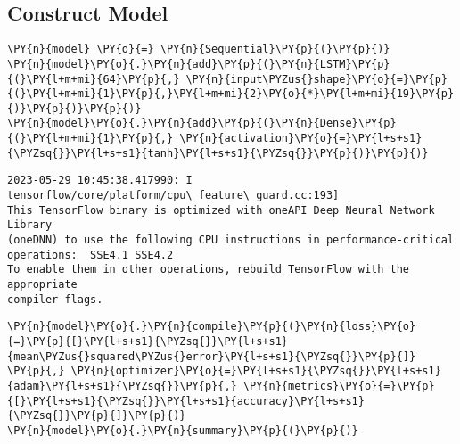     \hypertarget{construct-model}{%
\subsection{Construct Model}\label{construct-model}}

    \begin{tcolorbox}[breakable, size=fbox, boxrule=1pt, pad at break*=1mm,colback=cellbackground, colframe=cellborder]
\begin{Verbatim}[commandchars=\\\{\}]
\PY{n}{model} \PY{o}{=} \PY{n}{Sequential}\PY{p}{(}\PY{p}{)}
\PY{n}{model}\PY{o}{.}\PY{n}{add}\PY{p}{(}\PY{n}{LSTM}\PY{p}{(}\PY{l+m+mi}{64}\PY{p}{,} \PY{n}{input\PYZus{}shape}\PY{o}{=}\PY{p}{(}\PY{l+m+mi}{1}\PY{p}{,}\PY{l+m+mi}{2}\PY{o}{*}\PY{l+m+mi}{19}\PY{p}{)}\PY{p}{)}\PY{p}{)}
\PY{n}{model}\PY{o}{.}\PY{n}{add}\PY{p}{(}\PY{n}{Dense}\PY{p}{(}\PY{l+m+mi}{1}\PY{p}{,} \PY{n}{activation}\PY{o}{=}\PY{l+s+s1}{\PYZsq{}}\PY{l+s+s1}{tanh}\PY{l+s+s1}{\PYZsq{}}\PY{p}{)}\PY{p}{)}
\end{Verbatim}
\end{tcolorbox}

    \begin{Verbatim}[commandchars=\\\{\}]
2023-05-29 10:45:38.417990: I tensorflow/core/platform/cpu\_feature\_guard.cc:193]
This TensorFlow binary is optimized with oneAPI Deep Neural Network Library
(oneDNN) to use the following CPU instructions in performance-critical
operations:  SSE4.1 SSE4.2
To enable them in other operations, rebuild TensorFlow with the appropriate
compiler flags.
    \end{Verbatim}

    \begin{tcolorbox}[breakable, size=fbox, boxrule=1pt, pad at break*=1mm,colback=cellbackground, colframe=cellborder]
\begin{Verbatim}[commandchars=\\\{\}]
\PY{n}{model}\PY{o}{.}\PY{n}{compile}\PY{p}{(}\PY{n}{loss}\PY{o}{=}\PY{p}{[}\PY{l+s+s1}{\PYZsq{}}\PY{l+s+s1}{mean\PYZus{}squared\PYZus{}error}\PY{l+s+s1}{\PYZsq{}}\PY{p}{]} \PY{p}{,} \PY{n}{optimizer}\PY{o}{=}\PY{l+s+s1}{\PYZsq{}}\PY{l+s+s1}{adam}\PY{l+s+s1}{\PYZsq{}}\PY{p}{,} \PY{n}{metrics}\PY{o}{=}\PY{p}{[}\PY{l+s+s1}{\PYZsq{}}\PY{l+s+s1}{accuracy}\PY{l+s+s1}{\PYZsq{}}\PY{p}{]}\PY{p}{)}
\PY{n}{model}\PY{o}{.}\PY{n}{summary}\PY{p}{(}\PY{p}{)}
\end{Verbatim}
\end{tcolorbox}

